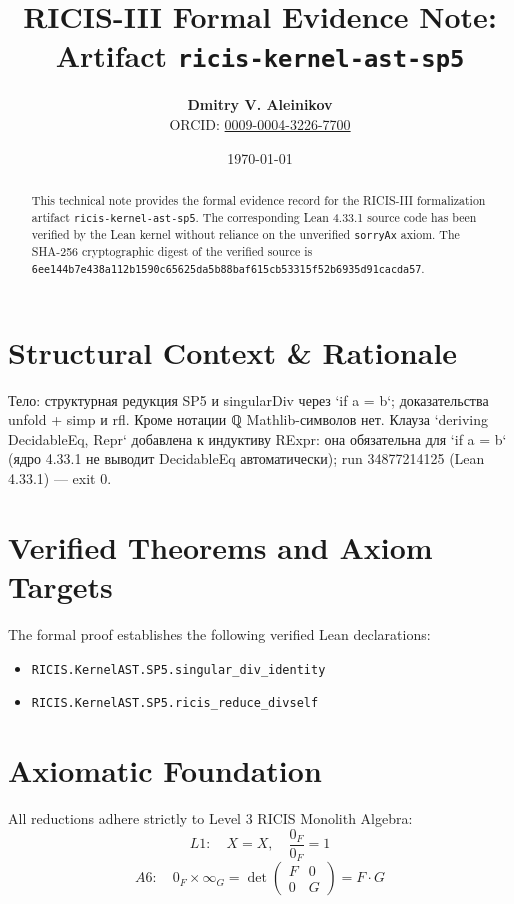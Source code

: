 \documentclass[11pt,a4paper]{article}
\title{\textbf{RICIS-III Formal Evidence Note:\\Artifact \texttt{ricis-kernel-ast-sp5}}}
\author{\textbf{Dmitry V. Aleinikov}\\ORCID: \href{https://orcid.org/0009-0004-3226-7700}{0009-0004-3226-7700}}
\date{\today}
\begin{document}
\maketitle

\begin{abstract}
This technical note provides the formal evidence record for the RICIS-III formalization artifact \texttt{ricis-kernel-ast-sp5}.
The corresponding Lean 4.33.1 source code has been verified by the Lean kernel without reliance on the unverified \texttt{sorryAx} axiom.
The SHA-256 cryptographic digest of the verified source is \texttt{6ee144b7e438a112b1590c65625da5b88baf615cb53315f52b6935d91cacda57}.
\end{abstract}

\section{Structural Context & Rationale}
Тело: структурная редукция SP5 и singularDiv через `if a = b`; доказательства unfold + simp и rfl. Кроме нотации ℚ Mathlib-символов нет. Клауза `deriving DecidableEq, Repr` добавлена к индуктиву RExpr: она обязательна для `if a = b` (ядро 4.33.1 не выводит DecidableEq автоматически); run 34877214125 (Lean 4.33.1) — exit 0.

\section{Verified Theorems and Axiom Targets}
The formal proof establishes the following verified Lean declarations:
\begin{itemize}
  \item \texttt{RICIS.KernelAST.SP5.singular_div_identity}
  \item \texttt{RICIS.KernelAST.SP5.ricis_reduce_divself}
\end{itemize}

\section{Axiomatic Foundation}
All reductions adhere strictly to Level 3 RICIS Monolith Algebra:
\begin{equation}
L1: \quad X = X, \quad \frac{0_F}{0_F} = 1
\end{equation}
\begin{equation}
A6: \quad 0_F \times \infty_G = \det\begin{pmatrix} F & 0 \\ 0 & G \end{pmatrix} = F \cdot G
\end{equation}
\end{document}
